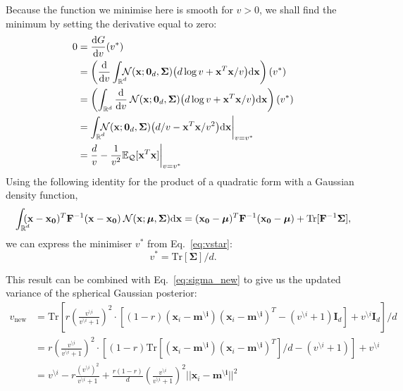 \documentclass[11pt]{article}
\newcommand{\vek}[1]{\ensuremath{\mathbf{#1}}}
\newcommand{\kve}{\ensuremath{\mathcal{Q}}}
\newcommand{\byd}{\ensuremath{\mathrm{d}}}
\newcommand{\norm}{\ensuremath{\:\mathcal{N}}}
\newcommand{\unity}{\ensuremath{\mathbf{I}}}
\newcommand{\ee}{\ensuremath{\mathbb{E}}}
\newcommand{\real}{\ensuremath{\mathbb{R}}}
\newcommand{\intr}{\ensuremath{\int_{\real^d}}}
\newcommand{\intrc}{\ensuremath{\int_{\rlap{\scriptsize$\real^d$}}\:}}
\newcommand{\intrcc}{\ensuremath{\int_{\rlap{\scriptsize$\real^d$}}}}
\begin{document}
Because the function we minimise here is smooth for $v > 0$, we shall 
find the minimum by setting the derivative equal to zero:
\begin{align}
	0 &= \frac{\byd G}{\byd v}(v^*) \\
	&= \left(\frac{\byd}{\byd v}\intrcc
		\norm(\vek{x}; \vek{0}_d, \vek{\Sigma})
		\big(d\log v + \vek{x}^T\vek{x}/v\big)\byd \vek{x}\right)(v^*) \\
	&= \left(\intr
		\frac{\byd}{\byd v}\norm(\vek{x}; \vek{0}_d, \vek{\Sigma})
		\big(d\log v + \vek{x}^T\vek{x}/v\big)\byd \vek{x}\right)(v^*) \\
	&= \intrcc
		\norm(\vek{x}; \vek{0}_d, \vek{\Sigma})
		\big(d/v - \vek{x}^T\vek{x}/v^2\big)\byd \vek{x}\bigg|_{v=v^*} \\
	&= \frac{d}{v} - \frac{1}{v^2} \ee_{\kve}[\vek{x}^T\vek{x}] 
\bigg|_{v=v^*}
	\label{eq:vstar}
\end{align}
Using the following identity for the product of a quadratic form with 
a Gaussian density function,
\begin{equation}
	\intrc
		(\vek{x}-\vek{x_0})^T\vek{F}^{-1}(\vek{x}-\vek{x_0})
		\norm(\vek{x}; \boldsymbol{\mu}, \vek{\Sigma}) \byd\vek{x}
	= (\vek{x_0} - \boldsymbol{\mu})^T\vek{F}^{-1}(\vek{x_0} - \boldsymbol{\mu})
	+ \text{Tr}[\vek{F}^{-1}\vek{\Sigma}],
\end{equation}
we can express the minimiser $v^*$ from Eq.~\eqref{eq:vstar}:
\begin{equation}
	v^* = \text{Tr}[\vek{\Sigma}] / d.
\end{equation}

This result can be combined with Eq.~\eqref{eq:sigma_new} to give us the 
updated variance of the spherical Gaussian posterior:
\begin{align}
		v_{\text{new}} &=
			\text{Tr}\left[r\left(\frac{v^{\setminus i}}{v^{\setminus i} 
			+ 1}\right)^2
			\cdot\left[
				(1 - r)(\vek{x}_i - \vek{m^{\setminus i}})(\vek{x}_i - \vek{m^{\setminus i}})^T
				- (v^{\setminus i} + 1)\unity_d
			\right]
			+ v^{\setminus i}\unity_d\right] / d \\
		&=
			r\left(\frac{v^{\setminus i}}{v^{\setminus i} + 1}\right)^2
			\cdot\left[(1 - r)
			\text{Tr}\left[(\vek{x}_i - \vek{m^{\setminus i}})
									   (\vek{x}_i - \vek{m^{\setminus i}})^T\right] / d
				- (v^{\setminus i} + 1)\right]
			+ v^{\setminus i} \\
		&=  v^{\setminus i}
			- r \frac{(v^{\setminus i})^2}{v^{\setminus i} + 1}
			+ \frac{r(1 - r)}{d}
				\left(\frac{v^{\setminus i}}{v^{\setminus i} + 1}\right)^2
				||\vek{x}_i - \vek{m^{\setminus i}}||^2
		\label{eq:vnew}
\end{align}
\end{document}
